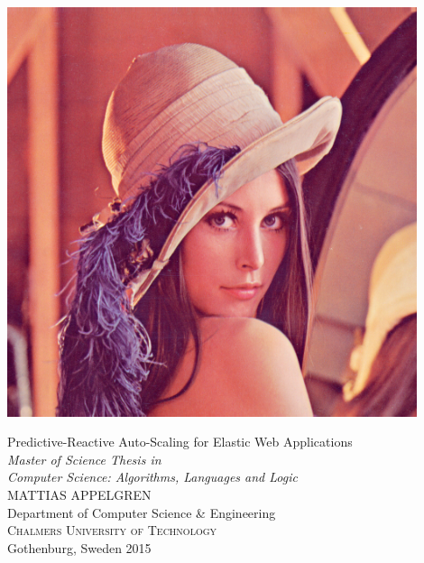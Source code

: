 \begin{titlepage}
\null
\vfill
\centering
    \includegraphics[width=0.9\textwidth]{resources/Lena.png}

\begin{flushleft}
{\Huge Predictive-Reactive Auto-Scaling for Elastic Web Applications}\\[.5cm]
\emph{
    \Large Master of Science Thesis in \\
    Computer Science: Algorithms, Languages and Logic
}\\[.5cm]
{\Large MATTIAS APPELGREN}\\[.5cm]
{
    \Large Department of Computer Science \& Engineering \\
    \textsc{Chalmers University of Technology} \\
    Gothenburg, Sweden 2015 \\
}
\end{flushleft}
\end{titlepage}

